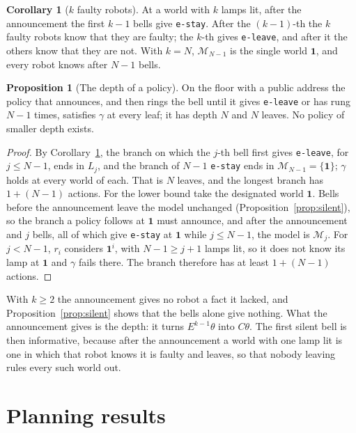 \documentclass[11pt,a4paper]{article}
\theoremstyle{definition}
\newtheorem{proposition}{Proposition}
\newtheorem{corollary}{Corollary}
\newcommand{\Mod}{\mathcal{M}}
\newcommand{\code}[1]{\texttt{\small #1}}
\newcommand{\some}{\theta}
\newcommand{\one}{\mathbf{1}}
\begin{document}
\begin{corollary}[$k$ faulty robots]
\label{cor:k}
At a world with $k$ lamps lit, after the announcement the first $k-1$ bells
give \code{e-stay}. After the $(k-1)$-th the $k$ faulty robots know that they
are faulty; the $k$-th gives \code{e-leave}, and after it the others know that
they are not. With $k = N$, $\Mod_{N-1}$ is the single world $\one$, and every
robot knows after $N - 1$ bells.
\end{corollary}

\begin{proposition}[The depth of a policy]
\label{prop:depth}
On the floor with a public address the policy that announces, and then rings
the bell until it gives \code{e-leave} or has rung $N-1$ times, satisfies
$\gamma$ at every leaf; it has depth $N$ and $N$ leaves. No policy of smaller
depth exists.
\end{proposition}

\begin{proof}
By Corollary~\ref{cor:k}, the branch on which the $j$-th bell first gives
\code{e-leave}, for $j \leq N-1$, ends in $L_j$, and the branch of $N-1$
\code{e-stay} ends in $\Mod_{N-1} = \{\one\}$; $\gamma$ holds at every world of
each. That is $N$ leaves, and the longest branch has $1 + (N-1)$ actions. For
the lower bound take the designated world $\one$. Bells before the
announcement leave the model unchanged (Proposition~\ref{prop:silent}), so the
branch a policy follows at $\one$ must announce, and after the announcement and
$j$ bells, all of which give \code{e-stay} at $\one$ while $j \leq N-1$, the
model is $\Mod_j$. For $j < N-1$, $r_i$ considers $\one^i$, with $N-1 \geq j+1$
lamps lit, so it does not know its lamp at $\one$ and $\gamma$ fails there.
The branch therefore has at least $1 + (N-1)$ actions.
\end{proof}

\noindent
With $k \geq 2$ the announcement gives no robot a fact it lacked, and
Proposition~\ref{prop:silent} shows that the bells alone give nothing. What the
announcement gives is the depth: it turns $E^{k-1}\some$ into $C\some$. The
first silent bell is then informative, because after the announcement a world
with one lamp lit is one in which that robot knows it is faulty and leaves, so
that nobody leaving rules every such world out.

\section{Planning results}
\label{sec:planning}
\end{document}
